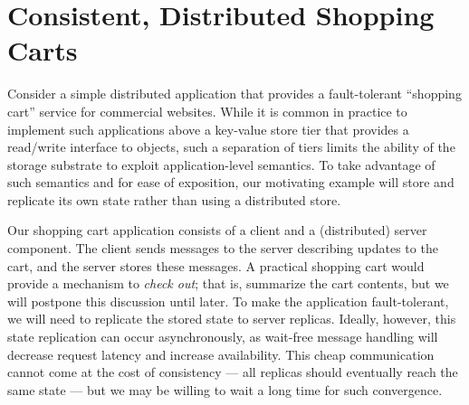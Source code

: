 \section{Consistent, Distributed Shopping Carts}
\label{sec:motivation}

Consider a simple distributed application that provides a fault-tolerant
``shopping cart'' service for commercial websites.  While it is common in
practice to implement such applications above a key-value store tier that
provides a read/write interface to objects, such a separation of tiers limits
the ability of the storage substrate to exploit application-level semantics.
To take advantage of such semantics and for ease of exposition,
our motivating example will store and replicate its own state rather
than using a distributed store.


Our shopping cart application consists of a client and a (distributed)
server component.  The client sends messages to
the server describing updates to the cart, and the server stores these 
messages.  
A practical shopping cart would provide a mechanism to {\em check out}; that is,
summarize the cart contents, but we will postpone this discussion until later.
To make the application fault-tolerant,
we will need to replicate the stored state to server replicas.  Ideally, however,
this state replication can occur asynchronously, as wait-free message handling
will decrease request latency and increase availability.  This cheap communication
cannot come at the cost of consistency --- all replicas should eventually reach
the same state --- but we may be willing to wait a long time for such convergence.

